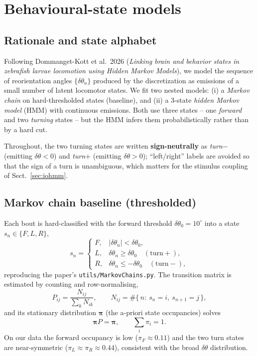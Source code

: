 \documentclass{article}
\begin{document}
\section{Behavioural-state models}
\label{sec:hmm}

\subsection{Rationale and state alphabet}
Following Dommanget-Kott et al.\ 2026 (\emph{Linking brain and behavior states in
zebrafish larvae locomotion using Hidden Markov Models}), we model the sequence
of reorientation angles $\{\delta\theta_n\}$ produced by the discretization as
emissions of a small number of latent locomotor states. We fit two nested
models: (i) a \emph{Markov chain} on hard-thresholded states (baseline), and
(ii) a 3-state \emph{hidden Markov model} (HMM) with continuous emissions. Both
use three states -- one \emph{forward} and two \emph{turning} states -- but the
HMM infers them probabilistically rather than by a hard cut.

Throughout, the two turning states are written \textbf{sign-neutrally} as
\emph{turn$-$} (emitting $\delta\theta<0$) and \emph{turn$+$} (emitting
$\delta\theta>0$); ``left/right'' labels are avoided so that the sign of a turn is
unambiguous, which matters for the stimulus coupling of Sect.~\ref{sec:iohmm}.

\subsection{Markov chain baseline (thresholded)}
Each bout is hard-classified with the forward threshold $\delta\theta_0=10^\circ$
into a state $s_n\in\{F,L,R\}$,
\[
s_n=
\begin{cases}
F, & |\delta\theta_n|<\delta\theta_0,\\
L, & \delta\theta_n \ge \delta\theta_0 \quad(\text{turn}+),\\
R, & \delta\theta_n \le -\delta\theta_0 \quad(\text{turn}-),
\end{cases}
\]
reproducing the paper's \texttt{utils/MarkovChains.py}. The transition matrix is
estimated by counting and row-normalising,
\[
P_{ij}=\frac{N_{ij}}{\sum_{k}N_{ik}},
\qquad
N_{ij}=\#\{\,n:\ s_n=i,\ s_{n+1}=j\,\},
\]
and its stationary distribution $\boldsymbol\pi$ (the a-priori state
occupancies) solves
\[
\boldsymbol\pi P = \boldsymbol\pi,\qquad \textstyle\sum_i \pi_i = 1 .
\]
On our data the forward occupancy is low ($\pi_F\approx0.11$) and the two turn
states are near-symmetric ($\pi_L\approx\pi_R\approx0.44$), consistent with the
broad $\delta\theta$ distribution.
\end{document}
